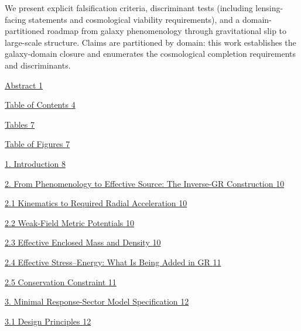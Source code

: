 \documentclass[11pt]{article}
\begin{document}
We present explicit falsification criteria, discriminant tests (including lensing-facing statements and cosmological viability requirements), and a domain-partitioned roadmap from galaxy phenomenology through gravitational slip to large-scale structure. Claims are partitioned by domain: this work establishes the galaxy-domain closure and enumerates the cosmological completion requirements and discriminants.

\clearpage
\tableofcontents
\listoftables
\listoffigures
\clearpage
\iffalse %
\hyperref[abstract]{Abstract \hyperref[abstract]{1}}

\hyperref[table-of-contents]{Table of Contents \hyperref[table-of-contents]{4}}

\hyperref[tables]{Tables \hyperref[tables]{7}}

\hyperref[table-of-figures]{Table of Figures \hyperref[table-of-figures]{7}}

\hyperref[introduction]{1. Introduction \hyperref[introduction]{8}}

\hyperref[from-phenomenology-to-effective-source-the-inverse-gr-construction]{2. From Phenomenology to Effective Source: The Inverse-GR Construction \hyperref[from-phenomenology-to-effective-source-the-inverse-gr-construction]{10}}

\hyperref[kinematics-to-required-radial-acceleration]{2.1 Kinematics to Required Radial Acceleration \hyperref[kinematics-to-required-radial-acceleration]{10}}

\hyperref[weak-field-metric-potentials]{2.2 Weak-Field Metric Potentials \hyperref[weak-field-metric-potentials]{10}}

\hyperref[effective-enclosed-mass-and-density]{2.3 Effective Enclosed Mass and Density \hyperref[effective-enclosed-mass-and-density]{10}}

\hyperref[effective-stressenergy-what-is-being-added-in-gr]{2.4 Effective Stress--Energy: What Is Being Added in GR \hyperref[effective-stress-energy-what-is-being-added-in-gr]{11}}

\hyperref[conservation-constraint]{2.5 Conservation Constraint \hyperref[conservation-constraint]{11}}

\hyperref[minimal-response-sector-model-specification]{3. Minimal Response-Sector Model Specification \hyperref[minimal-response-sector-model-specification]{12}}

\hyperref[design-principles]{3.1 Design Principles \hyperref[design-principles]{12}}
\end{document}
